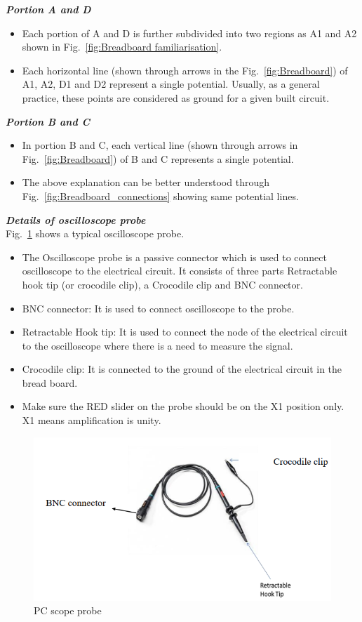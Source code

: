 \documentclass[9pt]{scrreprt}
\begin{document}
\textbf{\textit{Portion A and D}}
\begin{itemize}
\item Each portion of A and D is further subdivided into two regions as A1 and A2 shown in Fig.~\ref{fig:Breadboard familiarisation}.
\item Each horizontal line (shown through arrows in the Fig.~\ref{fig:Breadboard}) of A1, A2, D1 and D2 represent a single potential. Usually, as a general practice, these points are considered as ground for a given built circuit.
\end{itemize}

\textbf{\textit{Portion B and C}}
\begin{itemize}
\item In portion B and C, each vertical line (shown through arrows in Fig.~\ref{fig:Breadboard}) of B and C represents a single potential.
\item The above explanation can be better understood through Fig.~\ref{fig:Breadboard_connections} showing same potential lines.
\end{itemize}

\textbf{\textit{Details of oscilloscope probe}}\\

Fig.~\ref{fig:Oscilloscope_probe} shows a typical oscilloscope probe.

\begin{itemize}
\item The Oscilloscope probe is a passive connector which is used to connect oscilloscope to the electrical circuit. It consists of three parts Retractable hook tip (or crocodile clip), a Crocodile clip and BNC connector.
\item BNC connector: It is used to connect oscilloscope to the probe.
\item Retractable Hook tip: It is used to connect the node of the electrical circuit to the oscilloscope where there is a need to measure the signal.
\item Crocodile clip: It is connected to the ground of the electrical circuit in the bread board.
\item Make sure the RED slider on the probe should be on the X1 position only. X1 means amplification is unity.
\end{itemize}


\begin{figure}[H]
	\centering
	\includegraphics[width=0.6\linewidth]{logos/Oscilloscope_probe.png}
	\caption{PC scope probe}
	\label{fig:Oscilloscope_probe}
\end{figure}
\end{document}
